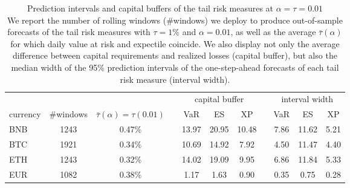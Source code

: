 \begin{table}[!htb]
\centering
\caption{Prediction intervals and capital buffers of the tail risk measures at $\alpha=\tau=0.01$\\ {\footnotesize We report the number of rolling windows (\#windows) we deploy to produce out-of-sample forecasts of the tail risk measures with $\tau=1\%$ and $\alpha=0.01$, as well as the average $\bar\tau(\alpha)$ for which daily value at risk and expectile coincide. We also display not only the average difference between capital requirements and realized losses (capital buffer), but also the median width of the 95\% prediction intervals of the one-step-ahead forecasts of each tail risk measure (interval width).}}
\label{tab:app_clt_mapping}
\begin{tabular}{lccrcccrccc}
\toprule
 & & && \multicolumn{3}{c}{capital buffer} && \multicolumn{3}{c}{interval width}\\
\cline{5-7}\cline{9-11}
currency & \#windows & $\bar\tau(\alpha)=\tau(0.01)$ && VaR & ES & XP && VaR & ES & XP\\
\midrule
BNB & 1243 & 0.47\% &  & 13.97 & 20.95 & 10.48 &  & 7.86 & 11.62 & 5.21 \\
BTC & 1921 & 0.34\% &  & 10.69 & 14.92 & 7.92 &  & 4.50 & 11.47 & 4.40 \\
ETH & 1243 & 0.32\% &  & 14.02 & 19.09 & 9.95 &  & 6.86 & 11.84 & 5.33 \\
EUR & 1082 & 0.38\% &  & 1.17 & 1.63 & 0.90 &  & 0.35 & 0.75 & 0.28 \\
\bottomrule
\end{tabular}\end{table}
